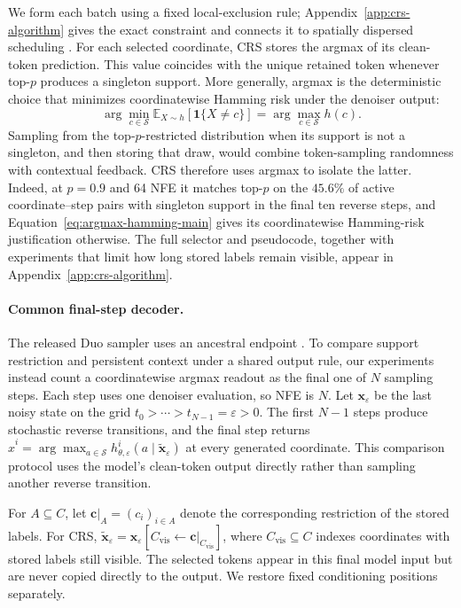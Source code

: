 \documentclass{article}
\newcommand{\1}{\mathbf 1}
\newcommand{\CRS}{\textsc{CRS}}
\theoremstyle{definition}
\begin{document}
We form each batch using a fixed local-exclusion rule;
Appendix~\ref{app:crs-algorithm} gives the exact constraint and connects it to
spatially dispersed scheduling
\citep{besnier2025halton,hayakawa2026demystifying}.
For each selected coordinate, \CRS{} stores the argmax of its clean-token
prediction. This value coincides with the unique retained token whenever
top-$p$ produces a singleton support. More generally, argmax is the
deterministic choice that minimizes coordinatewise Hamming risk under the
denoiser output:
\begin{equation}
 \arg\min_{c\in\mathcal S}
 \mathbb E_{X\sim h}\!\left[\1\{X\ne c\}\right]
 =\arg\max_{c\in\mathcal S}h(c).
 \label{eq:argmax-hamming-main}
\end{equation}
Sampling from the top-$p$-restricted distribution when its support is not a
singleton, and then storing that draw, would combine token-sampling randomness
with contextual feedback. \CRS{} therefore uses argmax to isolate the latter.
Indeed, at $p=0.9$ and 64 NFE it matches top-$p$ on the $45.6\%$ of active
coordinate--step pairs with singleton support in the final ten reverse steps, and
Equation~\eqref{eq:argmax-hamming-main} gives its coordinatewise Hamming-risk
justification otherwise. The full selector and pseudocode, together with
experiments that limit how long stored labels remain visible, appear in
Appendix~\ref{app:crs-algorithm}.

\paragraph{Common final-step decoder.}
The released Duo sampler uses an ancestral endpoint
\citep{sahoo2025duo,deschenaux2026psi}. To compare support restriction and
persistent context under a shared output rule, our experiments instead count a
coordinatewise argmax readout as the final one of $N$ sampling steps. Each
step uses one denoiser evaluation, so NFE is $N$. Let
$\bm x_{\varepsilon}$ be the last noisy state on
the grid $t_0>\cdots>t_{N-1}=\varepsilon>0$. The first $N-1$ steps produce
stochastic reverse transitions, and the final step returns
$\widehat x^i=\arg\max_{a\in\mathcal S}
h_{\theta,\varepsilon}^i(a\mid\widetilde{\bm x}_{\varepsilon})$ at every
generated coordinate. This comparison protocol uses the model's clean-token
output directly rather than sampling another reverse transition.

For $A\subseteq C$, let $\bm c|_A=(c_i)_{i\in A}$ denote the corresponding
restriction of the stored labels. For CRS,
$\widetilde{\bm x}_{\varepsilon}=\bm x_{\varepsilon}
[C_{\mathrm{vis}}\leftarrow\bm c|_{C_{\mathrm{vis}}}]$, where
$C_{\mathrm{vis}}\subseteq C$ indexes coordinates
with stored labels still visible. The selected tokens appear in this final
model input but are never copied directly to the output. We restore fixed
conditioning positions separately.
\end{document}

